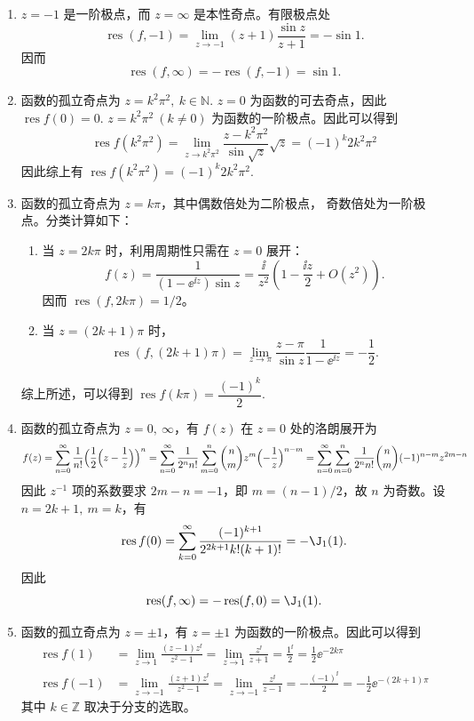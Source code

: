 \begin{question}
\begin{solution}
\begin{enumerate}
  \item \(z=-1\) 是一阶极点，而 \(z=\infty\) 是本性奇点。有限极点处
  \[
  \operatorname{res}(f,-1)
  =\lim_{z\to-1}(z+1)\frac{\sin z}{z+1}
  =-\sin1.
  \]
  因而
  \[
  \operatorname{res}(f,\infty)
  =-\operatorname{res}(f,-1)=\sin1.
  \]

  \item 函数的孤立奇点为 \(z=k^2\pi^2,\ k\in\mathbb{N}\). \(z=0\) 为函数的可去奇点，因此 \(\operatorname{res}f(0)=0\). \(z=k^2\pi^2\ (k\neq0)\) 为函数的一阶极点。因此可以得到
\[
\operatorname{res}f(k^2\pi^2)=\lim_{z\to k^2\pi^2}\frac{z-k^2\pi^2}{\sin\sqrt{z}}\sqrt{z}=(-1)^k2k^2\pi^2
\]
因此综上有 \(\operatorname{res}f(k^2\pi^2)=(-1)^k2k^2\pi^2\).

  \item 函数的孤立奇点为 \(z=k\pi\)，其中偶数倍处为二阶极点，
  奇数倍处为一阶极点。分类计算如下：
  \begin{enumerate}
    \item 当 \(z=2k\pi\) 时，利用周期性只需在 \(z=0\) 展开：
    \[
    f(z)=\frac1{(1-\ee^{\ii z})\sin z}
    =\frac{\ii}{z^2}\left(1-\frac{\ii z}{2}+O(z^2)\right).
    \]
    因而 \(\operatorname{res}(f,2k\pi)=1/2\)。

    \item 当 \(z=(2k+1)\pi\) 时，
    \[
    \operatorname{res}(f,(2k+1)\pi)
    =\lim_{z\to\pi}\frac{z-\pi}{\sin z}\frac1{1-\ee^{\ii z}}
    =-\frac12.
    \]
  \end{enumerate}

综上所述，可以得到 \(\operatorname{res}f(k\pi)=\dfrac{(-1)^k}{2}\).

  \item 函数的孤立奇点为 \(z=0,\ \infty\)，有 \(f(z)\) 在 \(z=0\) 处的洛朗展开为
\[
f(z)=\sum_{n=0}^\infty\frac1{n!}\Bigl(\frac12\Bigl(z-\frac1z\Bigr)\Bigr)^n=\sum_{n=0}^\infty\frac1{2^n n!}\sum_{m=0}^n\binom{n}{m}z^m\Bigl(-\frac1z\Bigr)^{n-m}=\sum_{n=0}^\infty\sum_{m=0}^n\frac{1}{2^n n!}\binom{n}{m}(-1)^{n-m}z^{2m-n}
\]
因此 \(z^{-1}\) 项的系数要求 \(2m-n=-1\)，即 \(m=(n-1)/2\)，故 \(n\) 为奇数。设 \(n=2k+1,\ m=k\)，有
\[
\operatorname{res}f(0)
=\sum_{k=0}^\infty
\frac{(-1)^{k+1}}{2^{2k+1}k!(k+1)!}
=-\J_1(1).
\]
因此
\[
\operatorname{res}(f,\infty)
=-\operatorname{res}(f,0)
=\J_1(1).
\]

  \item 函数的孤立奇点为 \(z=\pm1\)，有 \(z=\pm1\) 为函数的一阶极点。因此可以得到
\[
\begin{aligned}
\operatorname{res}f(1)&=\lim_{z\to1}\frac{(z-1)z^{\ii}}{z^2-1}=\lim_{z\to1}\frac{z^{\ii}}{z+1}=\frac{1^{\ii}}{2}=\frac12\ee^{-2k\pi}\\
\operatorname{res}f(-1)&=\lim_{z\to-1}\frac{(z+1)z^{\ii}}{z^2-1}=\lim_{z\to-1}\frac{z^{\ii}}{z-1}=-\frac{(-1)^{\ii}}{2}=-\frac12\ee^{-(2k+1)\pi}
\end{aligned}
\]
其中 \(k\in\mathbb{Z}\) 取决于分支的选取。


\end{enumerate}
\end{solution}
\end{question}
